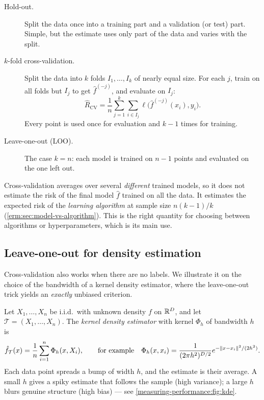 \begin{notechapter}
\begin{description}
  \item[Hold-out.] Split the data once into a training part and a validation
        (or test) part. Simple, but the estimate uses only part of the data and
        varies with the split.
  \item[$k$-fold cross-validation.] Split the data into $k$ folds
        $I_1,\dots,I_k$ of nearly equal size. For each $j$, train on all folds
        but $I_j$ to get $\hat f^{(-j)}$, and evaluate on $I_j$:
        \[
          \widehat R_{\mathrm{CV}} = \frac1n\sum_{j=1}^k\sum_{i\in I_j}\ell\bigl(\hat f^{(-j)}(x_i), y_i\bigr).
        \]
        Every point is used once for evaluation and $k-1$ times for training.
  \item[Leave-one-out (LOO).] The case $k = n$: each model is trained on $n-1$
        points and evaluated on the one left out.
\end{description}

\begin{keyidea}
Cross-validation averages over several \emph{different} trained models, so it
does not estimate the risk of the final model $\hat f$ trained on all the data.
It estimates the expected risk of the \emph{learning algorithm} at sample
size $n(k-1)/k$ (\cref{erm:sec:model-vs-algorithm}). This is the right quantity
for choosing between algorithms or hyperparameters, which is its main use.
\end{keyidea}

\subsection{Leave-one-out for density estimation}\label{measuring-performance:sec:mise}

Cross-validation also works when there are no labels. We illustrate it on the
choice of the bandwidth of a kernel density estimator, where the leave-one-out
trick yields an \emph{exactly} unbiased criterion.

Let $X_1,\dots,X_n$ be i.i.d.\ with unknown density $f$ on $\mathbb{R}^D$, and let
$\mathcal T = (X_1,\dots,X_n)$. The \emph{kernel density estimator} with kernel
$\Phi_h$ of bandwidth $h$ is
\[
  \hat f_{\mathcal T}(x) = \frac1n\sum_{i=1}^n\Phi_h(x, X_i),
  \qquad\text{for example}\quad \Phi_h(x, x_i) = \frac{1}{(2\pi h^2)^{D/2}}e^{-\left\|x - x_i\right\|^2/(2h^2)} .
\]
Each data point spreads a bump of width $h$, and the estimate is their average.
A small $h$ gives a spiky estimate that follows the sample (high variance); a
large $h$ blurs genuine structure (high bias) --- see
\cref{measuring-performance:fig:kde}.


\end{notechapter}
